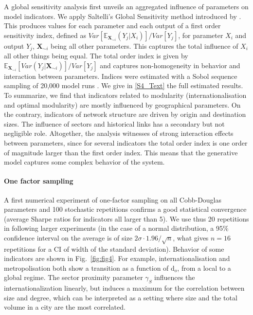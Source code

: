 \documentclass[10pt,letterpaper]{article}
\begin{document}
A global sensitivity analysis first unveils an aggregated influence of parameters on model indicators. We apply Saltelli's Global Sensitivity method introduced by \cite{saltelli2008global}. This produces values for each parameter and each output of a first order sensitivity index, defined as $Var\left[\mathbb{E}_{\mathbf{X}_{\sim i}}\left(Y_j | X_i\right)\right] / Var\left[Y_j\right]$, for parameter $X_i$ and output $Y_j$, $\mathbf{X}_{\sim i}$ being all other parameters. This captures the total influence of $X_i$ all other things being equal. The total order index is given by $\mathbb{E}_{\mathbf{X}_{\sim i}} \left[Var(Y_j | \mathbf{X}_{\sim i})\right] / Var\left[Y_j\right]$ and captures non-homogeneity in behavior and interaction between parameters. Indices were estimated with a Sobol sequence sampling of 20,000 model runs \cite{saltelli2010variance}. We give in \ref{S4_Text} the full estimated results. To summarize, we find that indicators related to modularity (internationalisation and optimal modularity) are mostly influenced by geographical parameters. On the contrary, indicators of network structure are driven by origin and destination sizes. The influence of sectors and historical links has a secondary but not negligible role. Altogether, the analysis witnesses of strong interaction effects between parameters, since for several indicators the total order index is one order of magnitude larger than the first order index. This means that the generative model captures some complex behavior of the system.



\paragraph{One factor sampling}

A first numerical experiment of one-factor sampling on all Cobb-Douglas parameters and 100 stochastic repetitions confirms a good statistical convergence (average Sharpe ratios for indicators all larger than 5). We use thus 20 repetitions in following larger experiments (in the case of a normal distribution, a 95\% confidence interval on the average is of size $2\sigma \cdot 1.96 / \sqrt{n}$, what gives $n=16$ repetitions for a CI of width of the standard deviation). Behavior of some indicators are shown in Fig.~\ref{fig:fig4}. For example, internationalisation and metropolisation both show a transition as a function of d$_o$, from a local to a global regime. The sector proximity parameter $\gamma_S$ influences the internationalization linearly, but induces a maximum for the correlation between size and degree, which can be interpreted as a setting where size and the total volume in a city are the most correlated.
\end{document}
